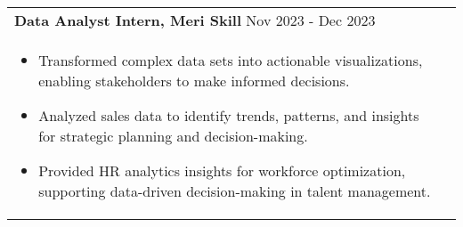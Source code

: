 \documentclass[a4paper,10pt]{article}
\begin{document}
\begin{tabularx}{\linewidth}{ @{}l r@{} }
\textbf {Data Analyst Intern, Meri Skill} \hfill Nov 2023 - Dec 2023 \\[4pt]
\begin{minipage}[t]{\linewidth}
    \begin{itemize}[nosep,after=\strut, leftmargin=2em, itemsep=2pt]
        \item Transformed complex data sets into actionable visualizations, enabling stakeholders to make informed decisions.
        \item Analyzed sales data to identify trends, patterns, and insights for strategic planning and decision-making.
        \item Provided HR analytics insights for workforce optimization, supporting data-driven decision-making in talent management.
    \end{itemize}
\end{minipage}
\end{tabularx}
\end{document}
